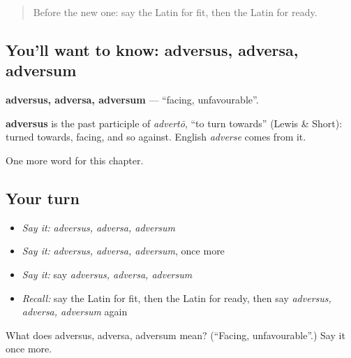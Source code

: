 \label{lesson:LA-C268-adversus}



\begin{quote}
Before the new one: say the Latin for fit, then the Latin for ready.
\end{quote}

\subsection*{You'll want to know: adversus, adversa, adversum}
\textbf{adversus, adversa, adversum} — \textquotedblleft{}facing, unfavourable\textquotedblright{}.

\begin{cousinweb}
\textbf{adversus} is the past participle of \emph{advertō}, \textquotedblleft{}to turn towards\textquotedblright{} (Lewis \& Short): turned towards, facing, and so against. English \emph{adverse} comes from it.
\end{cousinweb}

\begin{grammarlens}[title={What you've built}]
One more word for this chapter.
\end{grammarlens}

\subsection*{Your turn}
\begin{itemize}
\raggedright
  \item \emph{Say it:} \emph{adversus, adversa, adversum}
  \item \emph{Say it:} \emph{adversus, adversa, adversum}, once more
  \item \emph{Say it:} say \emph{adversus, adversa, adversum}
  \item \emph{Recall:} say the Latin for fit, then the Latin for ready, then say \emph{adversus, adversa, adversum} again
\end{itemize}

\begin{tcolorbox}[breakable,colback=teal!4,colframe=teal!35!black,title={Before you move on}]
What does adversus, adversa, adversum mean? (\textquotedblleft{}Facing, unfavourable\textquotedblright{}.) Say it once more.
\end{tcolorbox}
